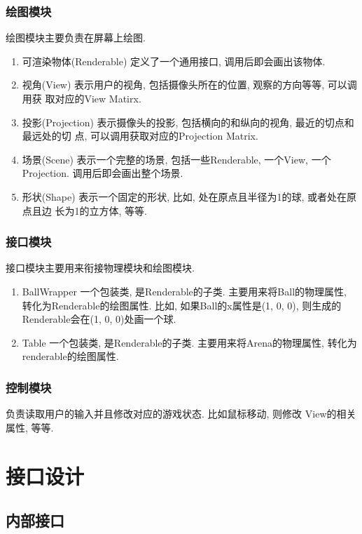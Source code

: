 \documentclass[11pt]{article}
\begin{document}
\subsubsection{绘图模块}
\label{sec-3-2-2}
绘图模块主要负责在屏幕上绘图.
\begin{enumerate}
\item 可渲染物体(Renderable)
\label{sec-3-2-2-1}
定义了一个通用接口, 调用后即会画出该物体. 
\item 视角(View)
\label{sec-3-2-2-2}
表示用户的视角, 包括摄像头所在的位置, 观察的方向等等, 可以调用获
取对应的View Matirx.
\item 投影(Projection)
\label{sec-3-2-2-3}
表示摄像头的投影, 包括横向的和纵向的视角, 最近的切点和最远处的切
点, 可以调用获取对应的Projection Matrix.
\item 场景(Scene)
\label{sec-3-2-2-4}
表示一个完整的场景, 包括一些Renderable, 一个View, 一个Projection.
调用后即会画出整个场景.
\item 形状(Shape)
\label{sec-3-2-2-5}
表示一个固定的形状, 比如, 处在原点且半径为1的球, 或者处在原点且边
长为1的立方体, 等等.
\end{enumerate}
\subsubsection{接口模块}
\label{sec-3-2-3}
接口模块主要用来衔接物理模块和绘图模块.
\begin{enumerate}
\item BallWrapper
\label{sec-3-2-3-1}
一个包装类, 是Renderable的子类. 主要用来将Ball的物理属性, 转化为Renderable的绘图属性.
比如, 如果Ball的x属性是(1, 0, 0), 则生成的Renderable会在(1, 0,
0)处画一个球.
\item Table
\label{sec-3-2-3-2}
一个包装类, 是Renderable的子类. 主要用来将Arena的物理属性, 转化为
renderable的绘图属性.
\end{enumerate}
\subsubsection{控制模块}
\label{sec-3-2-4}
负责读取用户的输入并且修改对应的游戏状态. 比如鼠标移动, 则修改
View的相关属性, 等等.
\section{接口设计}
\label{sec-4}
\subsection{内部接口}
\label{sec-4-1}
\end{document}
